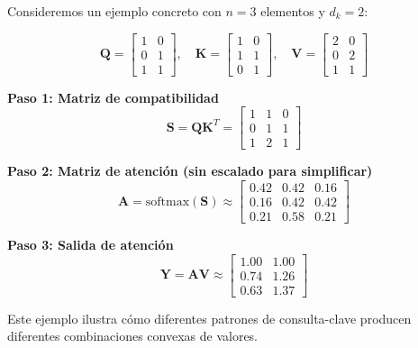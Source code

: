 \begin{example}\label{ex:explicit_3x3_attention}
    Consideremos un ejemplo concreto con $n=3$ elementos y $d_k=2$:
    
    \begin{equation}
        \mathbf{Q} = \begin{bmatrix} 1 & 0 \\ 0 & 1 \\ 1 & 1 \end{bmatrix}, \quad
        \mathbf{K} = \begin{bmatrix} 1 & 0 \\ 1 & 1 \\ 0 & 1 \end{bmatrix}, \quad
        \mathbf{V} = \begin{bmatrix} 2 & 0 \\ 0 & 2 \\ 1 & 1 \end{bmatrix}
    \end{equation}
    
    \textbf{Paso 1: Matriz de compatibilidad}
    \begin{equation}
        \mathbf{S} = \mathbf{Q}\mathbf{K}^T = \begin{bmatrix} 1 & 1 & 0 \\ 0 & 1 & 1 \\ 1 & 2 & 1 \end{bmatrix}
    \end{equation}

    \textbf{Paso 2: Matriz de atención (sin escalado para simplificar)}
    \begin{equation}
        \mathbf{A} = \text{softmax}(\mathbf{S}) \approx \begin{bmatrix} 0.42 & 0.42 & 0.16 \\ 0.16 & 0.42 & 0.42 \\ 0.21 & 0.58 & 0.21 \end{bmatrix}
    \end{equation}

    \textbf{Paso 3: Salida de atención}
    \begin{equation}
        \mathbf{Y} = \mathbf{A}\mathbf{V} \approx \begin{bmatrix} 1.00 & 1.00 \\ 0.74 & 1.26 \\ 0.63 & 1.37 \end{bmatrix}
    \end{equation}
    
    Este ejemplo ilustra cómo diferentes patrones de consulta-clave producen diferentes combinaciones convexas de valores.
\end{example}

